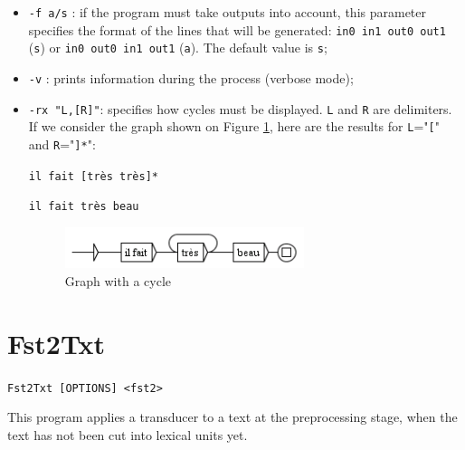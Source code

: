 \begin{itemize}
  \item \verb$-f a/s$ : if the program must take  outputs into account, this
  parameter specifies the format of the lines that will be generated:
  \verb$in0 in1 out0 out1$ (\verb$s$) or \verb$in0 out0 in1 out1$ (\verb$a$). The default
  value is \verb$s$;

  \item \verb$-v$ : prints information during the process (verbose mode);
  
  \item \verb$-rx "L,[R]"$: specifies how cycles must be displayed. \verb$L$ and
  \verb$R$ are delimiters. If we consider the graph shown on Figure \ref{cycle},
  here are the results for \verb$L$="\verb$[$" and \verb$R$="\verb$]*$":

  \medskip
  \noindent
  \texttt{il fait [tr\`es tr\`es]*}
  
  \noindent
  \texttt{il fait tr\`es beau}

\begin{figure}[h]
\begin{center}
\includegraphics[width=7cm]{resources/img/fig10-1.png}
\caption{Graph with a cycle\label{cycle}}
\end{center}
\end{figure}

\end{itemize}







\section{Fst2Txt}
\verb+Fst2Txt [OPTIONS] <fst2>+

\bigskip
\noindent This program applies a transducer to a text at the
preprocessing stage, when the text has not been cut into lexical units yet.

